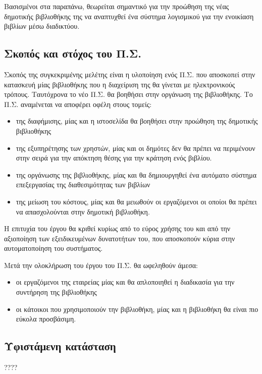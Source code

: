 \documentclass{assignment}
\begin{document}
Βασισμένοι στα παραπάνω, θεωρείται σημαντικό για την προώθηση της νέας δημοτικής βιβλιοθήκης της να αναπτυχθεί ένα σύστημα λογισμικού για την ενοικίαση βιβλίων μέσω διαδικτύου.

\subsection{Σκοπός και στόχος του Π.Σ.}

Σκοπός της συγκεκριμένης μελέτης είναι η υλοποίηση ενός Π.Σ. που αποσκοπεί στην κατασκευή μίας βιβλιοθήκης που η διαχείριση της θα γίνεται με ηλεκτρονικούς τρόπους. Ταυτόχρονα το νέο Π.Σ. θα βοηθήσει στην οργάνωση της βιβλιοθήκης. Το Π.Σ. αναμένεται να αποφέρει οφέλη στους τομείς:

\begin{itemize}
\item της διαφήμισης, μίας και η ιστοσελίδα θα βοηθήσει στην προώθηση της δημοτικής βιβλιοθήκης
\item της εξυπηρέτησης των χρηστών, μίας και οι δημότες δεν θα πρέπει να περιμένουν στην σειρά για την απόκτηση θέσης για την κράτηση ενός βιβλίου.
\item της οργάνωσης της βιβλιοθήκης, μίας και θα δημιουργηθεί ένα αυτόματο σύστημα επεξεργασίας της διαθεσιμότητας των βιβλίων
\item της μείωση του κόστους, μίας και θα μειωθούν οι εργαζόμενοι οι οποίοι θα πρέπει να απασχολούνται στην δημοτική βιβλιοθήκη. 
\end{itemize}

Η επιτυχία του έργου θα κριθεί κυρίως από το εύρος χρήσης του και από την αξιοποίηση των εξειδικευμένων δυνατοτήτων του, που αποσκοπούν κύρια στην αυτοματοποίηση του συστήματος.

Μετά την ολοκλήρωση του έργου του Π.Σ. θα ωφεληθούν άμεσα:

\begin{itemize}
\item οι εργαζόμενοι της εταιρείας μίας και θα απλοποιηθεί η διαδικασία για την συντήρηση της βιβλιοθήκης
\item οι κάτοικοι που χρησιμοποιούν την βιβλιοθήκη, μίας και η βιβλιοθήκη θα είναι πιο εύκολα προσβάσιμη. 
\end{itemize}

\subsection{Υφιστάμενη κατάσταση}

????
\end{document}
